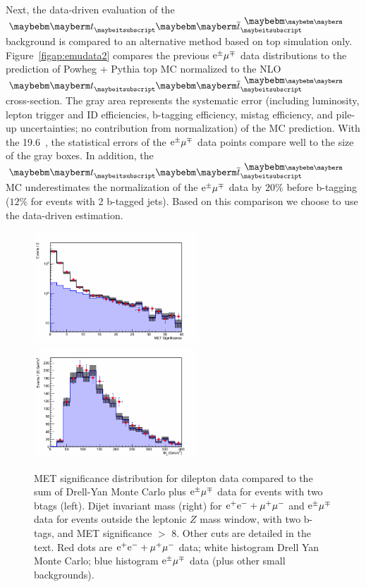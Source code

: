 Next, the data-driven evaluation of the $\Pqt \Paqt$ background is compared to an alternative
method based on top simulation only. 
Figure~\ref{figap:emudata2} compares the previous $\mathrm{e}^\pm\mu^\mp$ data distributions to the prediction of
Powheg + Pythia top MC normalized to the NLO $\Pqt \Paqt$ cross-section.
The gray area represents the systematic error (including luminosity, lepton trigger and ID efficiencies,
b-tagging efficiency, mistag efficiency, and pile-up uncertainties; no contribution from normalization) of the MC
prediction. With the 19.6~\fbinv{}, the statistical errors of the $\mathrm{e}^\pm\mu^\mp$ data points compare well
to the size of the gray boxes. In addition, the $\Pqt \Paqt$ MC underestimates the normalization of the
$\mathrm{e}^\pm\mu^\mp$ data by $20\%$ before b-tagging ($12\%$ for events with  2 b-tagged jets). Based on this comparison
we choose to use the data-driven estimation.

\begin{figure}[!htb]
  \centerline{
    \includegraphics[width=0.55\textwidth]{plots/emu_mets1l_2dy}
    \includegraphics[width=0.55\textwidth]{plots/emu_zjjm2_2dy_side}
  }
  \caption{ \label{figap:emu_ll_comp_met} MET significance distribution
    for dilepton data compared to the sum of Drell-Yan Monte Carlo
    plus $\mathrm{e}^\pm\mu^\mp$ data for events with two btags (left).
    Dijet invariant mass (right) for $\mathrm{e^+e^-} + \mu^+\mu^-$ and $\mathrm{e}^\pm\mu^\mp$
    data for events outside the leptonic $Z$ mass window, with two
    b-tags, and MET significance $>$ 8. Other cuts are
    detailed in the text.
    Red dots are $\mathrm{e^+e^-}+\mu^+\mu^-$ data; white
    histogram Drell Yan Monte Carlo; blue histogram $\mathrm{e}^\pm\mu^\mp$ data (plus
    other small backgrounds).}

\end{figure}

